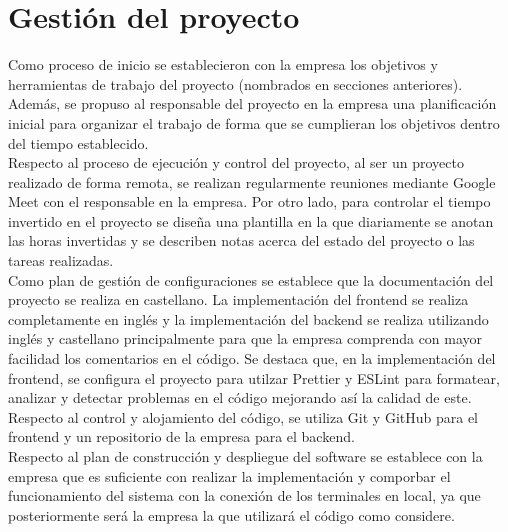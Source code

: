 \chapter{Gestión del proyecto}
\label{section-gestion-proyecto}

Como proceso de inicio se establecieron con la empresa los objetivos y herramientas de trabajo del proyecto (nombrados en secciones anteriores). Además, se propuso al responsable del proyecto en la empresa una planificación inicial para organizar el trabajo de forma que se cumplieran los objetivos dentro del tiempo establecido. \\

Respecto al proceso de ejecución y control del proyecto, al ser un proyecto realizado de forma remota, se realizan regularmente reuniones mediante Google Meet con el responsable en la empresa. Por otro lado, para controlar el tiempo invertido en el proyecto se diseña una plantilla en la que diariamente se anotan las horas invertidas y se describen notas acerca del estado del proyecto o las tareas realizadas. \\

Como plan de gestión de configuraciones se establece que la documentación del proyecto se realiza en castellano. La implementación del frontend se realiza completamente en inglés y la implementación del backend se realiza utilizando inglés y castellano principalmente para que la empresa comprenda con mayor facilidad los comentarios en el código. Se destaca que, en la implementación del frontend, se configura el proyecto para utilzar Prettier \cite{prettier} y ESLint \cite{eslint} para formatear, analizar y detectar problemas en el código mejorando así la calidad de este. Respecto al control y alojamiento del código, se utiliza Git y GitHub para el frontend y un repositorio de la empresa para el backend. \\


Respecto al plan de construcción y despliegue del software se establece con la empresa que es suficiente con realizar la implementación y comporbar el funcionamiento del sistema con la conexión de los terminales en local, ya que posteriormente será la empresa la que utilizará el código como considere. \\

